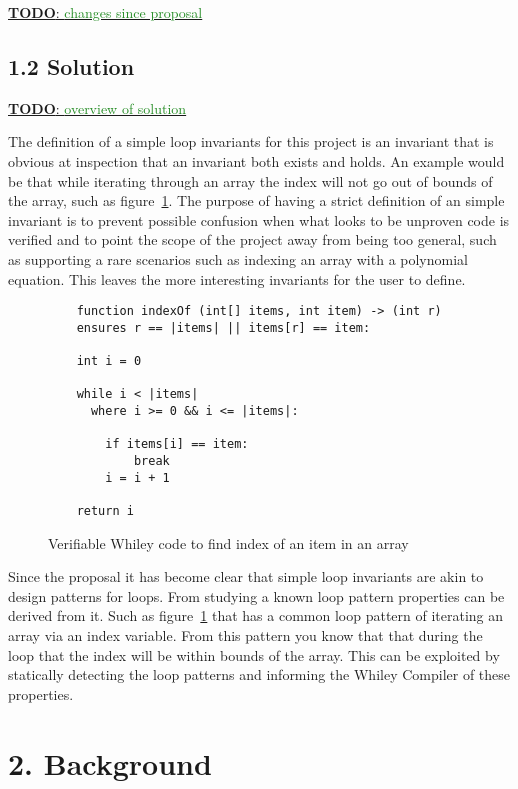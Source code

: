 \documentclass[11pt, a4paper, twoside, openright]{report}
\newcommand{\todo}[1]{\huge{\underline{\textbf{\textcolor{RubineRed}{TODO}}: \textcolor{ForestGreen}{#1}}}\normalsize }
\begin{document}
\todo{changes since proposal}

\subsection*{1.2 Solution}

\todo{overview of solution}

The definition of a simple loop invariants for this project is an invariant that is
obvious at inspection that an invariant both exists and holds.
An example would be that while iterating through an array the index
will not go out of bounds of the array, such as figure~\ref{lst:whiley-ex-1}.
The purpose of having a strict definition of an simple invariant is to prevent
possible confusion when what looks to be unproven code is verified and to point
the scope of the project away from being too general, such as supporting
a rare scenarios such as indexing an array with a polynomial equation.
This leaves the more interesting invariants for the user to define.

\begin{figure}[h]
\begin{lstlisting}
    function indexOf (int[] items, int item) -> (int r)
    ensures r == |items| || items[r] == item:

    int i = 0

    while i < |items|
      where i >= 0 && i <= |items|:

        if items[i] == item:
            break
        i = i + 1

    return i
\end{lstlisting}
\caption{Verifiable Whiley code to find index of an item in an array}
\label{lst:whiley-ex-1}
\end{figure}

Since the proposal it has become clear that simple loop invariants are
akin to design patterns for loops.
From studying a known loop pattern properties can be derived from it.
Such as figure~\ref{lst:whiley-ex-1} that has a common loop pattern of
iterating an array via an index variable.
From this pattern you know that that during the loop that the index will be
within bounds of the array.
This can be exploited by statically detecting the loop patterns and informing
the Whiley Compiler of these properties.

\section*{2. Background}
\end{document}
